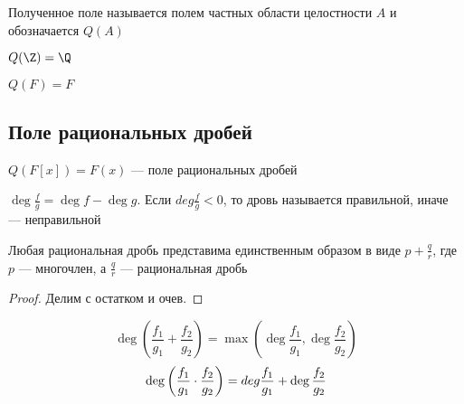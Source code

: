 \begin{definition}
    Полученное поле называется полем частных области целостности \(A\) и обозначается \(Q(A)\)
\end{definition}

\begin{example}
    \(Q(\Z) = \Q\)
\end{example}
\begin{example}
    \(Q(F) = F\)
\end{example}
\subsection{Поле рациональных дробей}
\begin{definition}
    \(Q(F[x]) = F(x)\) --- поле рациональных дробей
\end{definition}
\begin{definition}
    \(\deg \frac{f}{g} = \deg f - \deg g\). Если \(deg \frac{f}{g} < 0\), то дровь называется правильной, иначе --- неправильной
\end{definition}

\begin{proposition}
    Любая рациональная дробь представима единственным образом в виде \(p + \frac{q}{r}\), где \(p\) --- многочлен, а \(\frac{q}{r}\) --- рациональная дробь
\end{proposition}
\begin{proof}
    Делим с остатком и очев.
\end{proof}

\begin{proposition}
    \[\deg\left(\frac{f_1}{g_1} + \frac{f_2}{g_2}\right) = \max\left(\deg\frac{f_1}{g_1}, \deg\frac{f_2}{g_2}\right)\]
    \[\deg\left(\frac{f_1}{g_1} \cdot \frac{f_2}{g_2}\right) = \\deg\frac{f_1}{g_1} + \deg\frac{f_2}{g_2}\]
\end{proposition}

